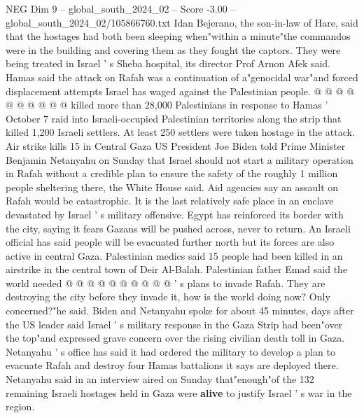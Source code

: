 \begin{textsample}{NEG Dim 9 – global\_south\_2024\_02 – Score -3.00 – global\_south\_2024\_02/105866760.txt}
Idan Bejerano, the son-in-law of Hare, said that the hostages had both been sleeping when"within a minute"the commandos were in the building and covering them as they fought the captors.
They were being treated in Israel ' s Sheba hospital, its director Prof Arnon Afek said.
Hamas said the attack on Rafah was a continuation of a"genocidal war"and forced displacement attempts Israel has waged against the Palestinian people. @ @ @ @ @ @ @ @ @ @ killed more than 28,000 Palestinians in response to Hamas ' October 7 raid into Israeli-occupied Palestinian territories along the strip that killed 1,200 Israeli settlers.
At least 250 settlers were taken hostage in the attack.
Air strike kills 15 in Central Gaza US President Joe Biden told Prime Minister Benjamin Netanyahu on Sunday that Israel should not start a military operation in Rafah without a credible plan to ensure the safety of the roughly 1 million people sheltering there, the White House said.
Aid agencies say an assault on Rafah would be catastrophic.
It is the last relatively safe place in an enclave devastated by Israel ' s military offensive.
Egypt has reinforced its border with the city, saying it fears Gazans will be pushed across, never to return.
An Israeli official has said people will be evacuated further north but its forces are also active in central Gaza.
Palestinian medics said 15 people had been killed in an airstrike in the central town of Deir Al-Balah.
Palestinian father Emad said the world needed @ @ @ @ @ @ @ @ @ @ ' s plans to invade Rafah.
They are destroying the city before they invade it, how is the world doing now?
Only concerned?"he said.
Biden and Netanyahu spoke for about 45 minutes, days after the US leader said Israel ' s military response in the Gaza Strip had been"over the top"and expressed grave concern over the rising civilian death toll in Gaza.
Netanyahu ' s office has said it had ordered the military to develop a plan to evacuate Rafah and destroy four Hamas battalions it says are deployed there.
Netanyahu said in an interview aired on Sunday that"enough"of the 132 remaining Israeli hostages held in Gaza were \textbf{alive} to justify Israel ' s war in the region.

\end{textsample}
